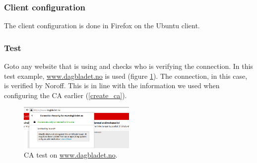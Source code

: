 \subsubsection{Client configuration}
The client configuration is done in Firefox on the Ubuntu client.


\subsubsection{Test}
Goto any website that is using  and checks who is verifying the connection. In this test example, \url{www.dagbladet.no} is used (figure \ref{opnsense:proxy_ca_test}). The connection, in this case, is verified by Noroff. This is in line with the information we used when configuring the CA earlier (\ref{create_ca}).

\begin{figure}[h!]
    \centering
    \includegraphics[width=0.5\textwidth]{Images/proxy/CA_test.PNG}
    \caption{CA test on \url{www.dagbladet.no}.}
    \label{opnsense:proxy_ca_test}
\end{figure}


